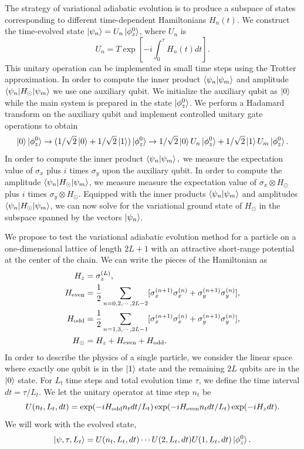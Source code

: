 \documentclass[aps,longbibliography,final,prl,onecolumn,superscriptaddress,nofootinbib,floatfix,11pt]{revtex4-1}
\begin{document}
The strategy of variational adiabatic evolution is to produce a subspace of states corresponding to different time-dependent Hamiltonians $H_{n}(t)$.  We construct the time-evolved state $\ket{\psi_n} = U_n\ket{\phi_z^0}$, where $U_n$ is 
\begin{equation}
U_n = T \exp\left[-i\int_0^\tau H_n(t) dt \right] \label{adiabatic}.
\end{equation}
 This unitary operation can be implemented in small time steps using the Trotter approximation. In order to compute the inner product $\braket{\psi_n|\psi_m}$ and amplitude $\braket{\psi_n|H_\odot|\psi_m}$ we use one auxiliary qubit.  We initialize the auxiliary qubit as $\ket{0}$ while the main system is prepared in the state $\ket{\phi_z^0}$.  We perform a Hadamard transform on the auxiliary qubit and implement controlled unitary gate operations to obtain     
\begin{equation}
\ket{0}\ket{\phi_z^0} \rightarrow (1/\sqrt{2}\ket{0} +1/\sqrt{2}\ket{1})\ket{\phi_z^0}
\rightarrow 1/\sqrt{2}\ket{0}U_n\ket{\phi_z^0} +1/\sqrt{2}\ket{1}U_m\ket{\phi_z^0}.
\end{equation}In order to compute the inner  product $\braket{\psi_n|\psi_m},$ we measure the expectation value of $\sigma_x$ plus $i$ times $\sigma_y$ upon the auxiliary qubit.
In order to compute the amplitude $\braket{\psi_n|H_\odot|\psi_m}$, we measure measure the expectation value of $\sigma_x \otimes H_\odot$ plus $i$ times $\sigma_y \otimes H_\odot$.
Equipped with the inner products $\braket{\psi_n|\psi_m}$
and amplitudes $\braket{\psi_n|H_\odot|\psi_m}$, we can now solve for the variational ground state of $H_\odot$ in the subspace spanned by the vectors $\ket{\psi_n}$. 

We propose to test the variational adiabatic evolution method for a particle on a one-dimensional lattice of length $2L+1$ with an attractive short-range potential at the center of the chain.  We can write the pieces of the Hamiltonian as     
\begin{align}
H_z &= \sigma_z^{(L)}, \\
H_{\rm even} &= \frac{1}{2} \sum_{n=0,2,\cdots,2L-2} [\sigma_x^{(n+1)}\sigma_x^{(n)}
+ \sigma_y^{(n+1)}\sigma_y^{(n)}], \\
H_{\rm odd} &= \frac{1}{2} \sum_{n=1,3,\cdots,2L-1} [\sigma_x^{(n+1)}\sigma_x^{(n)}
+ \sigma_y^{(n+1)}\sigma_y^{(n)}], \\
H_\odot &= H_z + H_{\rm even} + H_{\rm odd}.
\end{align}
In order to describe the physics of a single particle, we consider the linear space where exactly one qubit is in the $\ket{1}$ state and the remaining $2L$ qubits are in the  $\ket{0}$ state.  For $L_t$ time steps and total evolution time $\tau$, we define the time interval $dt=\tau/L_t$.  We let the unitary operator at time step $n_t$ be
\begin{equation}
U(n_t,L_{t},dt) = \exp(-iH_{\rm odd}n_tdt/L_t)\exp(-iH_{\rm even}n_tdt/L_t)\exp(-iH_ zdt).   
\end{equation} 
We will work with the evolved state,
\begin{equation}
\ket{\psi,\tau,L_t} = U(n_t,L_{t},dt) \cdots U(2,L_{t},dt)U(1,L_{t},dt)\ket{\phi_z^0}. 
\end{equation}
\end{document}
